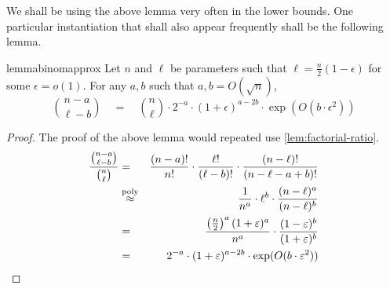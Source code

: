 We shall be using the above lemma very often in the lower bounds. 
One particular instantiation that shall also appear frequently shall be the following lemma.  

\begin{restatable}{lemma}{binomapprox}\label{lem:binom-approx}
Let $n$ and $\ell$ be parameters such that $\ell = \frac{n}{2}(1 - \epsilon)$ for some $\epsilon = o(1)$. 
For any $a, b$ such that $a,b = O(\sqrt{n})$, 
\[
\binom{n - a}{\ell - b} \quad = \quad \binom{n}{\ell} \cdot 2^{-a} \cdot (1+\epsilon)^{a-2b} \cdot \exp(O(b\cdot \epsilon^2))
\]
\end{restatable}
\begin{proof}
The proof of the above lemma would repeated use \autoref{lem:factorial-ratio}. 
\begin{eqnarray*}
\frac{\binom{n-a}{\ell -b}}{\binom{n}{\ell}} & = & \frac{(n-a)!}{n!} \cdot \frac{\ell!}{(\ell -b)!}\cdot \frac{(n-\ell)!}{(n-\ell-a+b)!}\\
& \stackrel{\operatorname{poly}}{\approx}& \frac{1}{n^a} \cdot \ell^b \cdot \frac{(n-\ell)^a}{(n-\ell)^b}\\
& = & \frac{\left(\frac{n}{2}\right)^a(1 +\varepsilon)^a}{n^a} \cdot \frac{(1-\varepsilon)^{b}}{(1+\varepsilon)^b}\\
& = & 2^{-a} \cdot (1+\varepsilon)^{a - 2b} \cdot \exp(O(b\cdot \varepsilon^2))
\end{eqnarray*}
\end{proof}


